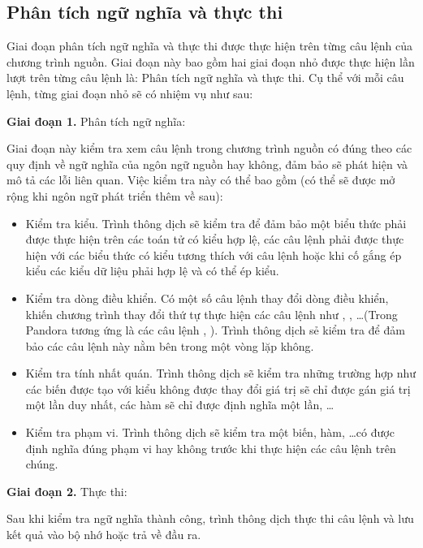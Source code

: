 \subsection{Phân tích ngữ nghĩa và thực thi}

Giai đoạn phân tích ngữ nghĩa và thực thi được thực hiện trên từng câu lệnh của chương trình nguồn. Giai đoạn này bao gồm hai giai đoạn nhỏ được thực hiện lần lượt trên từng câu lệnh là: Phân tích ngữ nghĩa và thực thi. Cụ thể với mỗi câu lệnh, từng giai đoạn nhỏ sẽ có nhiệm vụ như sau:

\textbf{Giai đoạn 1.} Phân tích ngữ nghĩa: 

Giai đoạn này kiểm tra xem câu lệnh trong chương trình nguồn có đúng theo các quy định về ngữ nghĩa của ngôn ngữ nguồn hay không, đảm bảo sẽ phát hiện và mô tả các lỗi liên quan. Việc kiểm tra này có thể bao gồm (có thể sẽ được mở rộng khi ngôn ngữ phát triển thêm về sau): 
\begin{itemize}
    \item Kiểm tra kiểu. Trình thông dịch sẽ kiểm tra để đảm bảo một biểu thức phải được thực hiện trên các toán tử có kiểu hợp lệ, các câu lệnh phải được thực hiện với các biểu thức có kiểu tương thích với câu lệnh hoặc khi cố gắng ép kiểu các kiểu dữ liệu phải hợp lệ và có thể ép kiểu.
    \item Kiểm tra dòng điều khiển. Có một số câu lệnh thay đổi dòng điều khiển, khiến chương trình thay đổi thứ tự thực hiện các câu lệnh như  , , \dots (Trong Pandora tương ứng là các câu lệnh , ). Trình thông dịch sẻ kiểm tra để đảm bảo các câu lệnh này nằm bên trong một vòng lặp không.
    \item Kiểm tra tính nhất quán. Trình thông dịch sẽ kiểm tra những trường hợp như các biến được tạo với kiểu không được thay đổi giá trị sẽ chỉ được gán giá trị một lần duy nhất, các hàm sẽ chỉ được định nghĩa một lần, \dots
    \item Kiểm tra phạm vi. Trình thông dịch sẽ kiểm tra một biến, hàm, \dots có được định nghĩa đúng phạm vi hay không trước khi thực hiện các câu lệnh trên chúng.
\end{itemize}

\textbf{Giai đoạn 2.} Thực thi: 

Sau khi kiểm tra ngữ nghĩa thành công, trình thông dịch thực thi câu lệnh và lưu kết quả vào bộ nhớ hoặc trả về đầu ra.
